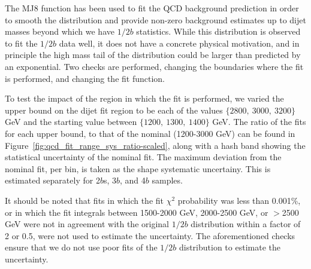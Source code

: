 The MJ8 function has been used to fit the QCD background prediction in order to smooth the distribution and provide non-zero background estimates up to dijet masses beyond which we have $1/2b$ statistics.  While this distribution is  observed to fit the $1/2b$ data well, it does not have a concrete physical motivation, and in principle the high mass tail of the distribution could be larger than predicted by an exponential.  Two checks are performed, changing the boundaries where the fit is performed, and changing the fit function.

To test the impact of the region in which the fit is performed, we varied the upper bound on the dijet fit region to be each of the values $\{2800,\ 3000,\ 3200\}$ GeV and the starting value between $\{1200,\ 1300,\ 1400\}$ GeV.  The ratio of the fits for each upper bound, to that of the nominal (1200-3000 GeV) can be found in Figure~\ref{fig:qcd_fit_range_sys_ratio-scaled}, along with a hash band showing the statistical uncertainty of the nominal fit.  The maximum deviation from the nominal fit, per bin, is taken as the shape systematic uncertainy.  This is estimated separately for 2$b$s, 3$b$, and 4$b$ samples.

It should be noted that fits in which the fit $\chi^2$ probability was less than 0.001\%, or in which the fit integrals between 1500-2000 GeV, 2000-2500 GeV, or $>$2500 GeV were not in agreement with the original $1/2b$ distribution within a factor of 2 or 0.5, were not used to estimate the uncertainty.  The aforementioned checks ensure that we do not use poor fits of the $1/2b$ distribution to estimate the uncertainty.



